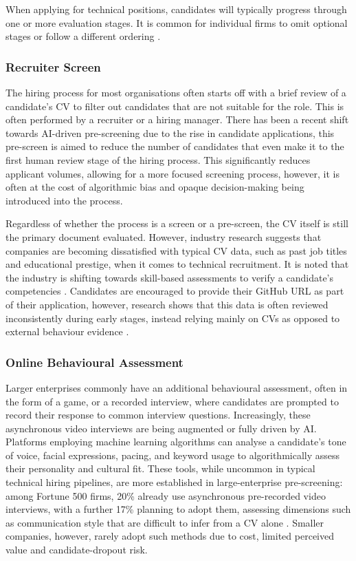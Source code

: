When applying for technical positions, candidates will typically progress through one or more evaluation stages.
It is common for individual firms to omit optional stages or follow a different ordering \cite{cappelli2019}.


\subsubsection{Recruiter Screen}
The hiring process for most organisations often starts off with a brief review of a candidate's CV to filter out 
candidates that are not suitable for the role. This is often performed by a recruiter or a hiring manager.
There has been a recent shift towards AI-driven pre-screening due to the rise in candidate applications, this
pre-screen is aimed to reduce the number of candidates that even make it to the first human review stage of the hiring process.
This significantly reduces applicant volumes, allowing for a more focused screening process, however, it is often at the cost
of algorithmic bias and opaque decision-making being introduced into the process.

Regardless of whether the process is a screen or a pre-screen, the CV itself is still the primary document evaluated.
However, industry research suggests that companies are becoming dissatisfied with typical CV data, such as past job titles
and educational prestige, when it comes to technical recruitment. It is noted that the industry is shifting towards skill-based
assessments to verify a candidate's competencies \cite{hackerrank2024skills}. Candidates are encouraged to provide their
GitHub URL as part of their application, however, research shows that this data is often reviewed inconsistently
during early stages, instead relying mainly on CVs as opposed to external behaviour evidence \cite{moore2023}.

\subsubsection{Online Behavioural Assessment} 
Larger enterprises commonly have an additional behavioural assessment, often in the form of a game, or a recorded interview, where candidates are prompted to record their response to common interview questions. 
Increasingly, these asynchronous video interviews are being augmented or fully driven by AI. Platforms employing machine learning 
algorithms can analyse a candidate's tone of voice, facial expressions, pacing, and keyword usage to algorithmically assess their 
personality and cultural fit. 
These tools, while uncommon in typical technical hiring pipelines, are more established in large-enterprise pre-screening: 
among Fortune 500 firms, 20\% already use asynchronous pre-recorded video interviews, with a further 17\% planning to adopt 
them, assessing dimensions such as communication style that are difficult to infer from a CV alone \cite{ithaka2018_assessment}. 
Smaller companies, however, rarely adopt such methods due to cost, limited perceived value and candidate-dropout risk.

